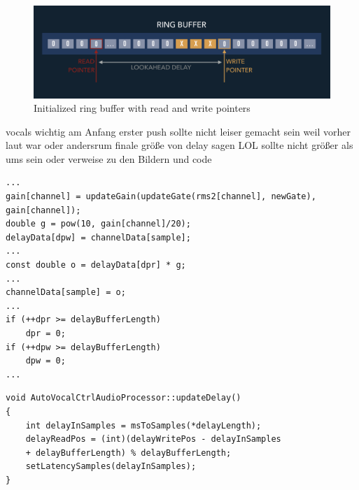 \begin{figure}[H]
\includegraphics[width=\textwidth]{images/ring_buffer}
\caption{Initialized ring buffer with read and write pointers}
\end{figure}

vocals wichtig am Anfang erster push sollte nicht leiser gemacht sein weil vorher laut war oder andersrum
finale größe von delay sagen LOL
sollte nicht größer als ums sein oder
verweise zu den Bildern und code

\begin{lstlisting}[frame=single]
...
gain[channel] = updateGain(updateGate(rms2[channel], newGate),
gain[channel]);
double g = pow(10, gain[channel]/20);
delayData[dpw] = channelData[sample];
...
const double o = delayData[dpr] * g;
...
channelData[sample] = o;
...
if (++dpr >= delayBufferLength)
	dpr = 0;
if (++dpw >= delayBufferLength)
	dpw = 0;
...
\end{lstlisting}

\begin{lstlisting}[frame=single]
void AutoVocalCtrlAudioProcessor::updateDelay()
{
    int delayInSamples = msToSamples(*delayLength);
    delayReadPos = (int)(delayWritePos - delayInSamples
    + delayBufferLength) % delayBufferLength;
    setLatencySamples(delayInSamples);
}
\end{lstlisting}